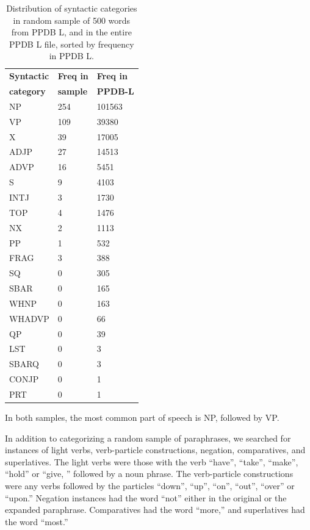 \documentclass[11pt]{article}
\begin{document}
\begin{itemize}
\begin{table}
\hfill{}
\begin{center}
\begin{tabular}{|l|l|l|}
\hline \bf Syntactic  & \bf Freq in  & \bf Freq in  \\ 
\bf  category & \bf sample & \bf PPDB-L \\ \hline
NP & 254 & 101563 \\
VP & 109 & 39380 \\
X & 39 & 17005 \\
ADJP & 27 & 14513 \\
ADVP & 16 & 5451 \\
S & 9 & 4103 \\
INTJ & 3 & 1730 \\
TOP & 4 & 1476 \\
NX & 2 & 1113 \\
PP & 1 & 532 \\
FRAG & 3 & 388  \\ 
SQ & 0 & 305 \\
SBAR & 0 & 165 \\
WHNP & 0 & 163 \\
WHADVP & 0 & 66 \\
QP & 0 & 39 \\
LST & 0 & 3 \\ 
SBARQ & 0 & 3 \\
CONJP & 0 & 1 \\
PRT & 0 & 1 \\
\hline
\end{tabular}
\end{center}
\caption{\label{sc-dist} Distribution of syntactic categories in random sample of 500 words from PPDB L, and in the entire PPDB L file, sorted by frequency in PPDB L. }
\end{table}

In both samples, the most common part of speech is NP, followed by VP. 

In addition to categorizing a random sample of paraphrases, we searched for instances of light verbs, verb-particle constructions, negation, comparatives, and superlatives. The light verbs were those with the verb “have”, “take”, “make”, “hold” or “give, ” followed by a noun phrase. The verb-particle constructions were any verbs followed by the particles “down”, “up”, “on”, “out”, “over” or “upon.” Negation instances had the word “not” either in the original or the expanded paraphrase. Comparatives had the word “more,” and superlatives had the word “most.”


\end{itemize}
\end{document}
